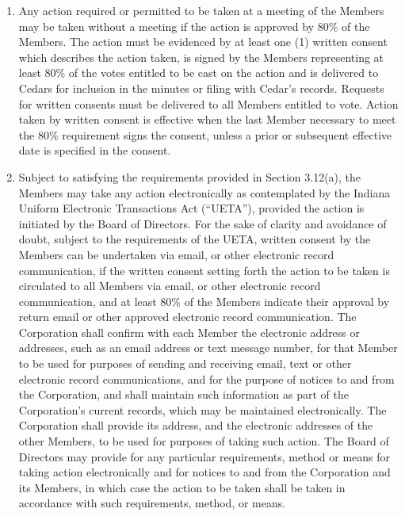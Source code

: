 \documentclass[
]{book}
\begin{document}
\begin{enumerate}
\def\labelenumi{\alph{enumi})}
\item
  Any action required or permitted to be taken at a meeting of the
  Members may be taken without a meeting if the action is approved by
  80\% of the Members. The action must be evidenced by at least one (1)
  written consent which describes the action taken, is signed by the
  Members representing at least 80\% of the votes entitled to be cast
  on the action and is delivered to Cedars for inclusion in the
  minutes or filing with Cedar's records. Requests for written
  consents must be delivered to all Members entitled to vote. Action
  taken by written consent is effective when the last Member necessary
  to meet the 80\% requirement signs the consent, unless a prior or
  subsequent effective date is specified in the consent.
\item
  Subject to satisfying the requirements provided in Section 3.12(a),
  the Members may take any action electronically as contemplated by
  the Indiana Uniform Electronic Transactions Act (``UETA''), provided
  the action is initiated by the Board of Directors. For the sake of
  clarity and avoidance of doubt, subject to the requirements of the
  UETA, written consent by the Members can be undertaken via email, or
  other electronic record communication, if the written consent
  setting forth the action to be taken is circulated to all Members
  via email, or other electronic record communication, and at least
  80\% of the Members indicate their approval by return email or other
  approved electronic record communication. The Corporation shall
  confirm with each Member the electronic address or addresses, such
  as an email address or text message number, for that Member to be
  used for purposes of sending and receiving email, text or other
  electronic record communications, and for the purpose of notices to
  and from the Corporation, and shall maintain such information as
  part of the Corporation's current records, which may be maintained
  electronically. The Corporation shall provide its address, and the
  electronic addresses of the other Members, to be used for purposes
  of taking such action. The Board of Directors may provide for any
  particular requirements, method or means for taking action
  electronically and for notices to and from the Corporation and its
  Members, in which case the action to be taken shall be taken in
  accordance with such requirements, method, or means.
\end{enumerate}
\end{document}
